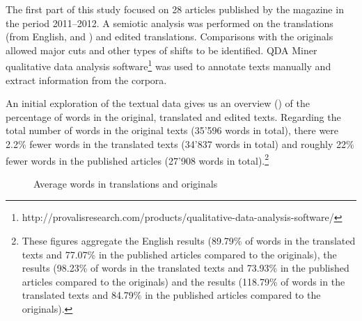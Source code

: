 \documentclass[output=paper]{LSP/langsci}
\begin{document}
The first part of this study focused on 28 articles published by the magazine in the period 2011--2012. A semiotic analysis was performed on the translations (from English,  and ) and edited translations. Comparisons with the originals allowed major cuts and other types of shifts to be identified. %
QDA Miner qualitative data analysis software\footnote{http://provalisresearch.com/products/qualitative-data-analysis-software/} was used to annotate texts manually and extract information from the corpora. 

An initial exploration of the textual data gives us an overview () of the percentage of words in the original, translated and edited texts. Regarding the total number of words in the original texts (35'596 words in total), there were 2.2\% fewer words in the translated texts (34'837 words in total) and roughly 22\% fewer words in the published articles (27'908 words in total).\footnote{These figures aggregate the English results (89.79\% of words in the translated texts and 77.07\% in the published articles compared to the originals), the  results (98.23\% of words in the translated texts and 73.93\% in the published articles compared to the originals) and the  results (118.79\% of words in the translated texts and 84.79\% in the published articles compared to the originals).}


\begin{figure}
\caption{Average words in translations and originals}
\label{troqe-marchan:fig:3}
\end{figure}
\end{document}
